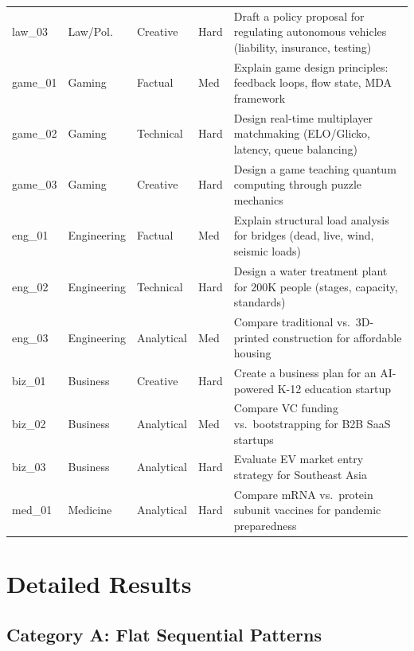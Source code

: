 \documentclass{article}
\begin{document}
\begin{table}[t]
{\begin{tabular}{@{}llllp{10cm}@{}}
law\_03 & Law/Pol. & Creative & Hard & Draft a policy proposal for regulating autonomous vehicles (liability, insurance, testing) \\
game\_01 & Gaming & Factual & Med & Explain game design principles: feedback loops, flow state, MDA framework \\
game\_02 & Gaming & Technical & Hard & Design real-time multiplayer matchmaking (ELO/Glicko, latency, queue balancing) \\
game\_03 & Gaming & Creative & Hard & Design a game teaching quantum computing through puzzle mechanics \\
eng\_01 & Engineering & Factual & Med & Explain structural load analysis for bridges (dead, live, wind, seismic loads) \\
eng\_02 & Engineering & Technical & Hard & Design a water treatment plant for 200K people (stages, capacity, standards) \\
eng\_03 & Engineering & Analytical & Med & Compare traditional vs.\ 3D-printed construction for affordable housing \\
biz\_01 & Business & Creative & Hard & Create a business plan for an AI-powered K-12 education startup \\
biz\_02 & Business & Analytical & Med & Compare VC funding vs.\ bootstrapping for B2B SaaS startups \\
biz\_03 & Business & Analytical & Hard & Evaluate EV market entry strategy for Southeast Asia \\
med\_01 & Medicine & Analytical & Hard & Compare mRNA vs.\ protein subunit vaccines for pandemic preparedness \\
\bottomrule
\end{tabular}
}
\end{table}

\section{Detailed Results}
\label{app:results}

\subsection{Category A: Flat Sequential Patterns}
\end{document}

